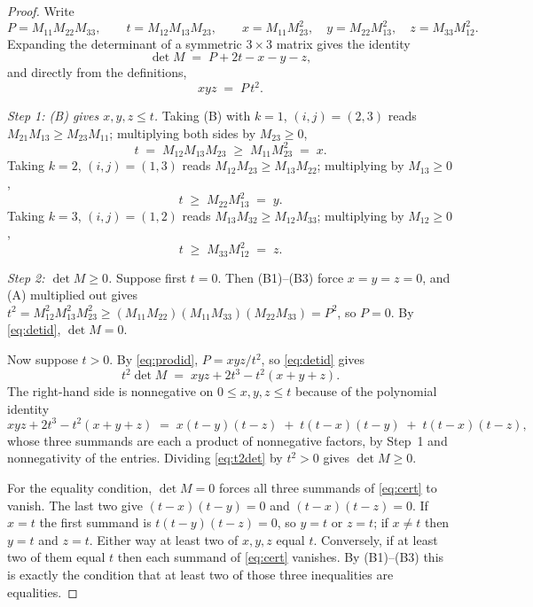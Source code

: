 \documentclass[11pt]{article}
\theoremstyle{plain}
\theoremstyle{definition}
\begin{document}
\begin{proof}
Write
\[
P=M_{11}M_{22}M_{33},\qquad t=M_{12}M_{13}M_{23},\qquad
x=M_{11}M_{23}^2,\quad y=M_{22}M_{13}^2,\quad z=M_{33}M_{12}^2 .
\]
Expanding the determinant of a symmetric $3\times3$ matrix gives the identity
\begin{equation}\label{eq:detid}
\det M \;=\; P+2t-x-y-z ,
\end{equation}
and directly from the definitions,
\begin{equation}\label{eq:prodid}
xyz \;=\; P\,t^2 .
\end{equation}

\emph{Step 1: (B) gives $x,y,z\le t$.} Taking (B) with $k=1$, $(i,j)=(2,3)$ reads
$M_{21}M_{13}\ge M_{23}M_{11}$; multiplying both sides by $M_{23}\ge0$,
\[
\tag{B1} t\;=\;M_{12}M_{13}M_{23}\;\ge\;M_{11}M_{23}^2\;=\;x .
\]
Taking $k=2$, $(i,j)=(1,3)$ reads $M_{12}M_{23}\ge M_{13}M_{22}$; multiplying by $M_{13}\ge0$,
\[
\tag{B2} t\;\ge\;M_{22}M_{13}^2\;=\;y .
\]
Taking $k=3$, $(i,j)=(1,2)$ reads $M_{13}M_{32}\ge M_{12}M_{33}$; multiplying by $M_{12}\ge0$,
\[
\tag{B3} t\;\ge\;M_{33}M_{12}^2\;=\;z .
\]

\emph{Step 2: $\det M\ge0$.} Suppose first $t=0$. Then (B1)--(B3) force $x=y=z=0$, and (A)
multiplied out gives
$t^2=M_{12}^2M_{13}^2M_{23}^2\ge (M_{11}M_{22})(M_{11}M_{33})(M_{22}M_{33})=P^2$, so $P=0$.
By \eqref{eq:detid}, $\det M=0$.

Now suppose $t>0$. By \eqref{eq:prodid}, $P=xyz/t^2$, so \eqref{eq:detid} gives
\begin{equation}\label{eq:t2det}
 t^2\det M \;=\; xyz+2t^3-t^2(x+y+z).
\end{equation}
The right-hand side is nonnegative on $0\le x,y,z\le t$ because of the polynomial identity
\begin{equation}\label{eq:cert}
 xyz+2t^3-t^2(x+y+z)\;=\;x(t-y)(t-z)\;+\;t(t-x)(t-y)\;+\;t(t-x)(t-z),
\end{equation}
whose three summands are each a product of nonnegative factors, by Step~1 and nonnegativity of the
entries. Dividing \eqref{eq:t2det} by $t^2>0$ gives $\det M\ge0$.

For the equality condition, $\det M=0$ forces all three summands of \eqref{eq:cert} to vanish. The
last two give $(t-x)(t-y)=0$ and $(t-x)(t-z)=0$. If $x=t$ the first summand is
$t(t-y)(t-z)=0$, so $y=t$ or $z=t$; if $x\ne t$ then $y=t$ and $z=t$. Either way at least two of
$x,y,z$ equal $t$. Conversely, if at least two of them equal $t$ then each summand
of \eqref{eq:cert} vanishes. By (B1)--(B3) this is exactly the condition that at least two of those
three inequalities are equalities.


\end{proof}
\end{document}
